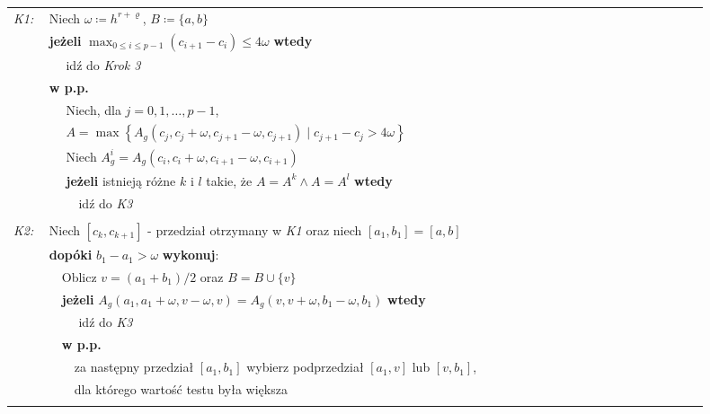 \documentclass[oik, pdftex, robocza, man]{mgrwms}
\begin{document}
    \vspace{10pt}
    \noindent
    \begin{tabular}{p{0.045\linewidth} p{0.85\linewidth}}
        \textit{K1:}    & Niech $\omega \coloneqq h^{r+\varrho}$, $B \coloneqq \{a, b\}$ \\
                        & \textbf{jeżeli} \(\displaystyle \max_{0 \leq i \leq p-1} (c_{i+1} - c_{i}) \leq 4\omega \) \textbf{wtedy} \\
                        & $\quad$ idź do \textit{Krok 3} \\
                        & \textbf{w p.p.} \\
                        & $\quad$ Niech, dla $j=0,1, \ldots, p-1$, \\
                        & $\quad$ $A=\max \left\{A_{g}\left(c_{j}, c_{j}+\omega, c_{j+1}-\omega, c_{j+1}\right) \mid c_{j+1}-c_{j}>4 \omega\right\}$ \\
                        & $\quad$ Niech $A_{g}^{i} = A_{g}\left(c_{i}, c_{i}+\omega, c_{i+1}-\omega, c_{i+1}\right)$ \\
                        & $\quad$ \textbf{jeżeli} istnieją różne $k$ i $l$ takie, że $A = A^{k} \land A = A^{l}$ \textbf{wtedy} \\
                        & $\quad\quad$ idź do \textit{K3} \\
                        & \\

        \textit{K2:}    & Niech $[c_{k}, c_{k+1}]$ - przedział otrzymany w \textit{K1} oraz niech $[a_{1}, b_{1}] = [a, b]$ \\
                        & \textbf{dopóki} $b_{1} - a_{1} > \omega$ \textbf{wykonuj}: \\
                        & $\quad$Oblicz $v = (a_{1} + b_{1}) / 2$ oraz $B = B \cup \{v\}$ \\
                        & $\quad$\textbf{jeżeli} $A_{g}(a_{1}, a_{1} + \omega, v - \omega, v) = A_{g}(v, v + \omega, b_{1} - \omega, b_{1})$ \textbf{wtedy} \\
                        & $\quad$$\quad$ idź do \textit{K3} \\
                        & $\quad$\textbf{w p.p.} \\
                        & $\quad$$\quad$za następny przedział $[a_{1}, b_{1}]$ wybierz podprzedział $[a_{1}, v]$ lub $[v, b_{1}]$, \\
                        & $\quad$$\quad$dla którego wartość testu była większa \\
                        &  \\


\end{tabular}
\end{document}
